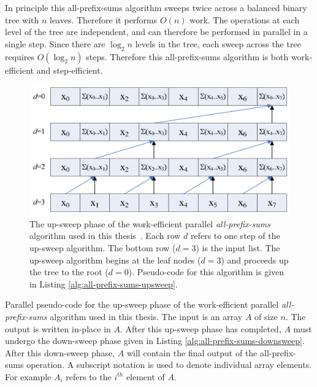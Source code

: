 In principle this all-prefix-sums algorithm sweeps twice across a balanced binary tree with $n$ leaves. Therefore it performs $O(n)$ work. The operations at each level of the tree are independent, and can therefore be performed in parallel in a single step. Since there are $\log_2 n$ levels in the tree, each sweep across the tree requires $O(\log_2 n)$ steps. Therefore this all-prefix-sums algorithm is both work-efficient and step-efficient.
\pagebreak
\begin{figure}[t]
\centering
\includegraphics[width=6.0in]{figures/upsweep.png}
\caption{The up-sweep phase of the work-efficient parallel \emph{all-prefix-sums} algorithm used in this thesis~\cite{Blelloch-1993,Harris-2007,Sengupta-2011}. Each row $d$ refers to one step of the up-sweep algorithm. The bottom row ($d=3$) is the input list. The up-sweep algorithm begins at the leaf nodes ($d=3$) and proceeds up the tree to the root ($d=0$). Pseudo-code for this algorithm is given in Listing \ref{alg:all-prefix-sums-upsweep}.}
\label{fig:upsweep}
\end{figure}
\begin{Listing}[t]
    \caption{Parallel pseudo-code for the up-sweep phase of the work-efficient parallel \emph{all-prefix-sums} algorithm used in this thesis. The input is an array $A$ of size $n$. The output is written in-place in $A$. After this up-sweep phase has completed, $A$ must undergo the down-sweep phase given in Listing \ref{alg:all-prefix-sums-downsweep}. After this down-sweep phase, $A$ will contain the final output of the all-prefix-sums operation. A subscript notation is used to denote individual array elements. For example $A_{i}$ refers to the $i^{th}$ element of $A$.~\cite{Blelloch-1993} }
    \begin{algorithmic}[1]
            \ENDFOR
        \ENDFOR
    \end{algorithmic}
    \label{alg:all-prefix-sums-upsweep}
\end{Listing}
